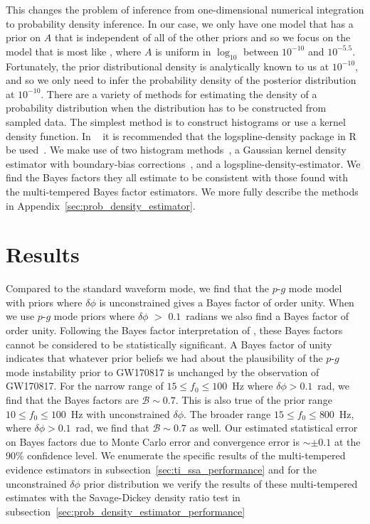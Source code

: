 This changes the problem of inference from one-dimensional numerical integration to probability density inference. In our case, we only have one model that has a prior on $A$ that is independent of all of the other priors and so we focus on the model that is most like \cite{abbott2019constraining}, where $A$ is uniform in $\log_{10}$ between $10^{-10}$ and $10^{-5.5}$. Fortunately, the prior distributional density is analytically known to us at $10^{-10}$, and so we only need to infer the probability density of the posterior distribution at $10^{-10}$. There are a variety of methods for estimating the density of a probability distribution when the distribution has to be constructed from sampled data. The simplest method is to construct histograms or use a kernel density function. In  ~\cite{wagenmakers2010bayesian} it is recommended that the logspline-density package in R be used~\citep{stone1997polynomial}. We make use of two histogram methods~\citep{scott1979optimal, Freedman1981}, a Gaussian kernel density estimator with boundary-bias corrections~\citep{lewis2015getdist}, and a logspline-density-estimator. We find the Bayes factors they all estimate to be consistent with those found with the multi-tempered Bayes factor estimators. We more fully describe the methods in Appendix~\ref{sec:prob_density_estimator}.

\section{Results}
\label{sec:results}
Compared to the standard waveform mode, we find that the $p$-$g$ mode model with priors where $\delta \phi$ is unconstrained gives a Bayes factor of order unity. When we use $p$-$g$ mode priors where $\delta \phi$ $>$ $0.1$~radians we also find a Bayes factor of order unity. Following the Bayes factor interpretation of \cite{kass1995bayes, jeffreys1998theory}, these Bayes factors cannot be considered to be statistically significant. A Bayes factor of unity indicates that whatever prior beliefs we had about the plausibility of the $p$-$g$ mode instability prior to GW170817 is unchanged by the observation of GW170817. For the narrow range of $15 \le f_0 \le 100$~Hz where $\delta \phi > 0.1$~rad, we find that the Bayes factors are $\mathcal{B} \sim 0.7$. This is also true of the prior range $10 \le f_0 \le 100$~Hz with unconstrained $\delta \phi$. The broader range  $15 \le f_0 \le 800$~Hz, where $\delta \phi > 0.1$~rad, we find that $\mathcal{B} \sim 0.7$ as well. Our estimated statistical error on Bayes factors due to Monte Carlo error and convergence error is $\sim \pm 0.1$ at the $90$\% confidence level. We enumerate the specific results of the multi-tempered evidence estimators in subsection~\ref{sec:ti_ssa_performance} and for the unconstrained $\delta \phi$ prior distribution we verify the results of these multi-tempered estimates with the Savage-Dickey density ratio test in subsection~\ref{sec:prob_density_estimator_performance} 

